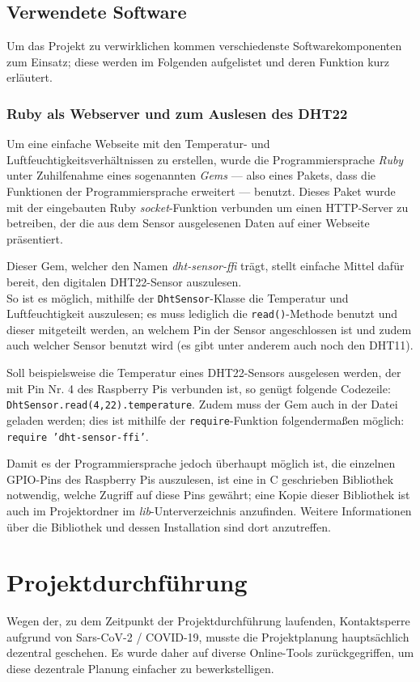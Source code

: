 \documentclass[a4paper,12pt]{article}
\begin{document}
\subsection{Verwendete Software}
Um das Projekt zu verwirklichen kommen verschiedenste Softwarekomponenten zum Einsatz; diese werden im Folgenden aufgelistet und deren Funktion kurz erläutert.

\subsubsection{Ruby als Webserver und zum Auslesen des DHT22}
Um eine einfache Webseite mit den Temperatur- und Luftfeuchtigkeitsverhältnissen zu erstellen, wurde die Programmiersprache \textit{Ruby} unter Zuhilfenahme eines sogenannten \textit{Gems} — also eines Pakets, dass die Funktionen der Programmiersprache erweitert — benutzt. Dieses Paket wurde mit der eingebauten Ruby \textit{socket}-Funktion verbunden um einen HTTP-Server zu betreiben, der die aus dem Sensor ausgelesenen Daten auf einer Webseite präsentiert.

Dieser Gem, welcher den Namen \textit{dht-sensor-ffi} trägt, stellt einfache Mittel dafür bereit, den digitalen DHT22-Sensor auszulesen.\\
So ist es möglich, mithilfe der \texttt{DhtSensor}-Klasse die Temperatur und Luftfeuchtigkeit auszulesen; es muss lediglich die \texttt{read()}-Methode benutzt und dieser mitgeteilt werden, an welchem Pin der Sensor angeschlossen ist und zudem auch welcher Sensor benutzt wird (es gibt unter anderem auch noch den DHT11). 

Soll beispielsweise die Temperatur eines DHT22-Sensors ausgelesen werden, der mit Pin Nr. 4 des Raspberry Pis verbunden ist, so genügt folgende Codezeile: \texttt{DhtSensor.read(4,22).temperature}. Zudem muss der Gem auch in der Datei geladen werden; dies ist mithilfe der \texttt{require}-Funktion folgendermaßen möglich: \texttt{require 'dht-sensor-ffi'}.

Damit es der Programmiersprache jedoch überhaupt möglich ist, die einzelnen GPIO-Pins des Raspberry Pis auszulesen, ist eine in C geschrieben Bibliothek notwendig, welche Zugriff auf diese Pins gewährt; eine Kopie dieser Bibliothek ist auch im Projektordner im \textit{lib}-Unterverzeichnis anzufinden. Weitere Informationen über die Bibliothek und dessen Installation sind dort anzutreffen.

\pagebreak
\section{Projektdurchführung}
Wegen der, zu dem Zeitpunkt der Projektdurchführung laufenden, Kontaktsperre aufgrund von Sars-CoV-2 / COVID-19, musste die Projektplanung hauptsächlich dezentral geschehen.
Es wurde daher auf diverse Online-Tools zurückgegriffen, um diese dezentrale Planung einfacher zu bewerkstelligen.
\end{document}
